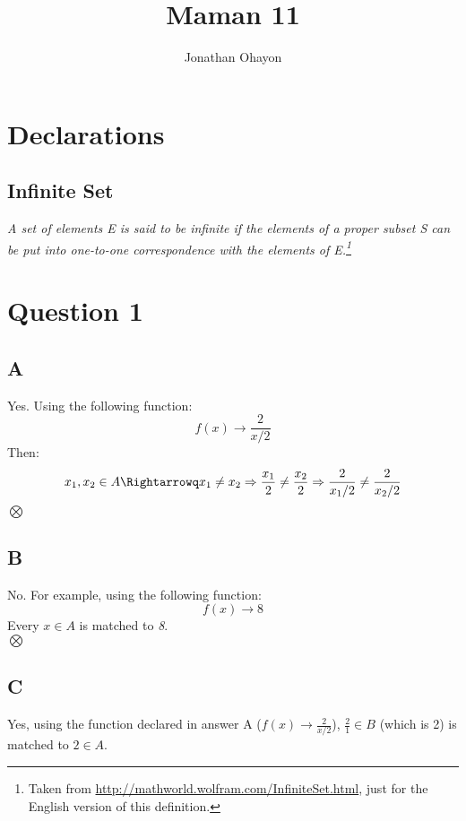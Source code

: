 \documentclass[12pt, oneside]{article}
\title{Maman 11}
\author{Jonathan Ohayon}
\begin{document}
\maketitle
\setcounter{section}{-1}

\section{Declarations}
\subsection{Infinite Set}
\begin{center}
\emph{A set of elements E is said to be infinite if the elements of a proper subset S can be put into one-to-one correspondence with the elements of E.\footnote{Taken from \url{http://mathworld.wolfram.com/InfiniteSet.html}, just for the English version of this definition.}}
\end{center}

\section{Question 1}
\subsection{A}
Yes. Using the following function:
\begin{equation*}
f(x) \rightarrow \frac{2}{x/2}
\end{equation*}
Then:
\begin{equation*}
x_1, x_2 \in A \Rightarrowq
x_1 \neq x_2 \Rightarrow
\frac{x_1}{2} \neq \frac{x_2}{2} \Rightarrow
\frac{2}{x_1/2} \neq \frac{2}{x_2/2}
\end{equation*}
$\bigotimes$

\subsection{B}
No. For example, using the following function:
\begin{equation*}
f(x) \rightarrow 8
\end{equation*}
Every $x \in A$ is matched to \emph{8}.\\
$\bigotimes$

\subsection{C}
Yes, using the function declared in answer A ($f(x) \rightarrow \frac{2}{x/2}$), $\frac{2}{1} \in B$ (which is 2) is matched to $2 \in A$.
\end{document}
